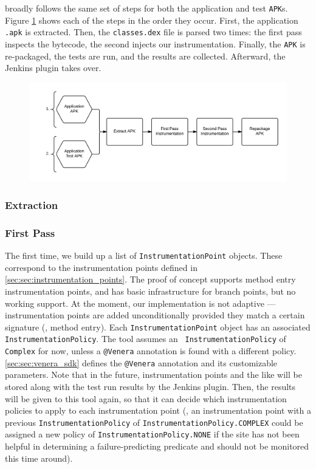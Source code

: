 \venera broadly follows the same set of steps for both the application and
test {\tt APK}s. Figure \ref{fig:instrumenting_apk} shows each of the steps in
the order they occur. First, the application {\tt .apk} is extracted. Then, the
{\tt classes.dex} file is parsed two times: the first pass inspects the
bytecode, the second injects our instrumentation. Finally, the {\tt APK} is
re-packaged, the tests are run, and the results are collected. Afterward, the
Jenkins plugin takes over.

\begin{figure}[h]
\includegraphics[width=\linewidth]{Images/instrumenting_apk}
\caption{}
\label{fig:instrumenting_apk}
\end{figure}

\subsubsection{Extraction}

\subsubsection{First Pass}

The first time, we build up a list of {\tt InstrumentationPoint} objects. These
correspond to the instrumentation points defined in
\autoref{sec:sec:instrumentation_points}. The proof of concept supports method
entry instrumentation points, and has basic infrastructure for branch points,
but no working support. At the moment, our implementation is not adaptive ---
instrumentation points are added unconditionally provided they match a certain
signature (\eg, method entry). Each {\tt InstrumentationPoint} object has an
associated {\tt InstrumentationPolicy}. The tool assumes an {\tt
InstrumentationPolicy} of {\tt Complex} for now, unless a {\tt @Venera}
annotation is found with a different policy. \autoref{sec:sec:venera_sdk}
defines the {\tt @Venera} annotation and its customizable parameters. Note
that in the future, instrumentation points and the like will be stored along
with the test run results by the Jenkins plugin. Then, the results will be given
to this tool again, so that it can decide which instrumentation policies to
apply to each instrumentation point (\eg, an instrumentation point with a
previous {\tt InstrumentationPolicy} of {\tt InstrumentationPolicy.COMPLEX}
could be assigned a new policy of {\tt InstrumentationPolicy.NONE} if the site
has not been helpful in determining a failure-predicting predicate and should
not be monitored this time around).

